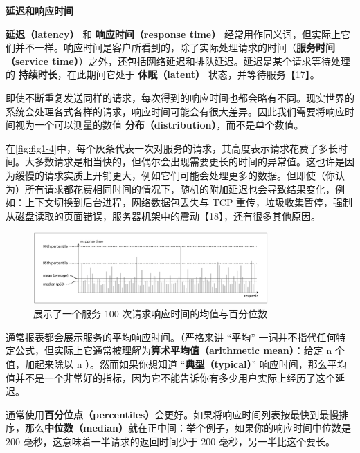 \begin{mdframed}[backgroundcolor=black!10,rightline=false,leftline=false]
  \textbf{延迟和响应时间}

  \textbf{延迟（latency）} 和 \textbf{响应时间（response time）} 经常用作同义词，但实际上它们并不一样。响应时间是客户所看到的，除了实际处理请求的时间（\textbf{服务时间（service time）}）之外，还包括网络延迟和排队延迟。延迟是某个请求等待处理的 \textbf{持续时长}，在此期间它处于 \textbf{休眠（latent）} 状态，并等待服务【17】。
\end{mdframed}

即使不断重复发送同样的请求，每次得到的响应时间也都会略有不同。现实世界的系统会处理各式各样的请求，响应时间可能会有很大差异。因此我们需要将响应时间视为一个可以测量的数值 \textbf{分布（distribution）}，而不是单个数值。

在\autoref{fig:fig1-4}中，每个灰条代表一次对服务的请求，其高度表示请求花费了多长时间。大多数请求是相当快的，但偶尔会出现需要更长的时间的异常值。这也许是因为缓慢的请求实质上开销更大，例如它们可能会处理更多的数据。但即使（你认为）所有请求都花费相同时间的情况下，随机的附加延迟也会导致结果变化，例如：上下文切换到后台进程，网络数据包丢失与 TCP 重传，垃圾收集暂停，强制从磁盘读取的页面错误，服务器机架中的震动【18】，还有很多其他原因。

\begin{figure}
  \centering
  \includegraphics[width=0.8\textwidth]{img/fig1-4.png}
  \caption{展示了一个服务 100 次请求响应时间的均值与百分位数}
  \label{fig:fig1-4}
\end{figure}

通常报表都会展示服务的平均响应时间。（严格来讲 “平均” 一词并不指代任何特定公式，但实际上它通常被理解为\textbf{算术平均值（arithmetic mean）}：给定 n 个值，加起来除以 n ）。然而如果你想知道 “\textbf{典型（typical）}” 响应时间，那么平均值并不是一个非常好的指标，因为它不能告诉你有多少用户实际上经历了这个延迟。

通常使用\textbf{百分位点（percentiles）}会更好。如果将响应时间列表按最快到最慢排序，那么\textbf{中位数（median）}就在正中间：举个例子，如果你的响应时间中位数是 200 毫秒，这意味着一半请求的返回时间少于 200 毫秒，另一半比这个要长。

